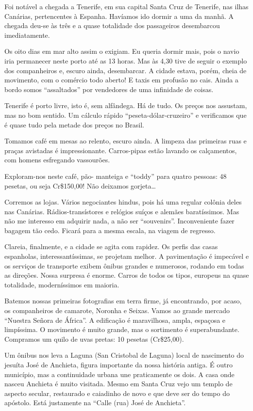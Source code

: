 Foi notável a chegada a Tenerife, em sua capital Santa Cruz de Tenerife, nas ilhas Canárias, pertencentes à Espanha. Havíamos ido dormir a uma da manhã. A chegada deu-se às três e a quase totalidade dos passageiros desembarcou imediatamente.

Os oito dias em mar alto assim o exigiam. Eu queria dormir mais, pois o navio iria permanecer neste porto até as 13 horas. Mas às 4,30 tive de seguir o exemplo dos companheiros e, escuro ainda, desembarcar. A cidade estava, porém, cheia de movimento, com o comércio todo aberto! E taxis em profusão no cais. Ainda a bordo somos “assaltados” por vendedores de uma infinidade de coisas.

Tenerife é porto livre, isto é, sem alfândega. Há de tudo. Os preços nos assustam, mas no bom sentido. Um cálculo rápido “peseta-dólar-cruzeiro” e verificamos que é quase tudo pela metade dos preços no Brasil.

Tomamos café em mesas ao relento, escuro ainda. A limpeza das primeiras ruas e praças avistadas é impressionante. Carros-pipas estão lavando os calçamentos, com homens esfregando vassourões.

Exploram-nos neste café, pão- manteiga e “toddy” para quatro pessoas: 48 pesetas, ou seja Cr\$150,00! Não deixamos gorjeta\ldots

Corremos as lojas. Vários negociantes hindus, pois há uma regular colônia deles nas Canárias. Rádios-transístores e relógios suíços e alemães baratíssimos. Mas não me interesso em adquirir nada, a não ser “souvenirs”. Inconveniente fazer bagagem tão cedo. Ficará para a mesma escala, na viagem de regresso.

Clareia, finalmente, e a cidade se agita com rapidez. Os perfis das casas espanholas, interessantíssimas, se projetam melhor. A pavimentação é impecável e os serviços de transporte exibem ônibus grandes e numerosos, rodando em todas as direções. Nossa surpresa é enorme. Carros de todos os tipos, europeus na quase totalidade, moderníssimos em maioria.

Batemos nossas primeiras fotografias em terra firme, já encontrando, por acaso, os companheiros de camarote, Noronha e Seixas. Vamos ao grande mercado “Nuestra Señora de África”. A edificação é maravilhosa, ampla, espaçosa e limpíssima. O movimento é muito grande, mas o sortimento é superabundante. Compramos um quilo de uvas pretas: 10 pesetas (Cr\$25,00).

Um ônibus nos leva a Laguna (San Cristobal de Laguna) local de nascimento do jesuíta José de Anchieta, figura importante da nossa história antiga. É outro município, mas a continuidade urbana une praticamente os dois. A casa onde nasceu Anchieta é muito visitada. Mesmo em Santa Cruz vejo um templo de aspecto secular, restaurado e caiadinho de novo e que deve ser do tempo do apóstolo. Está justamente na “Calle (rua) José de Anchieta”.

